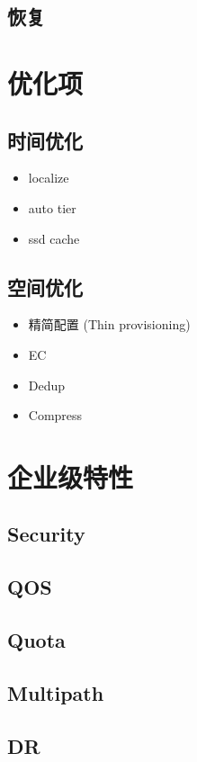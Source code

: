 \documentclass[UTF8]{ctexart}
\begin{document}
\subsection{恢复}

\section{优化项}

\subsection{时间优化}

\begin{itemize}
    \item localize
    \item auto tier
    \item ssd cache
\end{itemize}

\subsection{空间优化}

\begin{itemize}
    \item 精简配置 (Thin provisioning)
    \item EC
    \item Dedup
    \item Compress
\end{itemize}

\section{企业级特性}

\subsection{Security}
\subsection{QOS}
\subsection{Quota}
\subsection{Multipath}
\subsection{DR}
\end{document}

